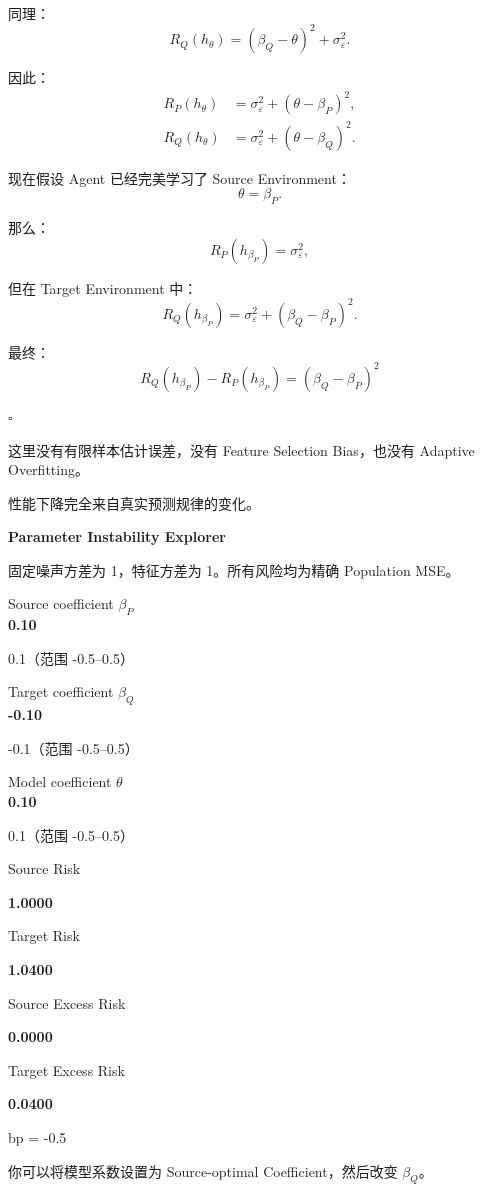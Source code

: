 同理：
\[R_Q(h_\theta)
=
(\beta_Q-\theta)^2+\sigma_\varepsilon^2.\]

因此：
\[\boxed{
\begin{aligned}
R_P(h_\theta)
&=\sigma_\varepsilon^2+(\theta-\beta_P)^2,\\
R_Q(h_\theta)
&=\sigma_\varepsilon^2+(\theta-\beta_Q)^2.
\end{aligned}
}\]

现在假设 Agent 已经完美学习了 Source Environment：
\[\theta=\beta_P.\]

那么：
\[R_P(h_{\beta_P})=\sigma_\varepsilon^2,\]

但在 Target Environment 中：
\[R_Q(h_{\beta_P})
=
\sigma_\varepsilon^2+(\beta_Q-\beta_P)^2.\]

最终：
\[\boxed{
R_Q(h_{\beta_P})-R_P(h_{\beta_P})
=
(\beta_Q-\beta_P)^2
}\]

\(\square\)

这里没有有限样本估计误差，没有 Feature Selection Bias，也没有 Adaptive Overfitting。

性能下降完全来自真实预测规律的变化。

\textbf{Parameter Instability Explorer}

固定噪声方差为 1，特征方差为 1。所有风险均为精确 Population MSE。

Source coefficient \(\beta_P\)\\
\textbf{0.10}

0.1（范围 -0.5--0.5）

Target coefficient \(\beta_Q\)\\
\textbf{-0.10}

-0.1（范围 -0.5--0.5）

Model coefficient \(\theta\)\\
\textbf{0.10}

0.1（范围 -0.5--0.5）


Source Risk

\textbf{1.0000}

Target Risk

\textbf{1.0400}

Source Excess Risk

\textbf{0.0000}

Target Excess Risk

\textbf{0.0400}

bp = -0.5


你可以将模型系数设置为 Source-optimal Coefficient，然后改变 \(\beta_Q\)。

